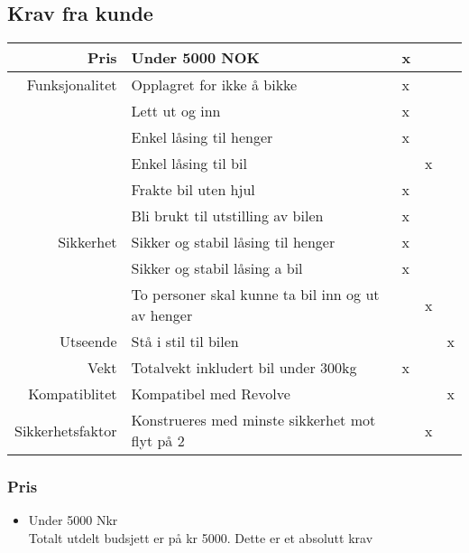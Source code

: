 \subsection{Krav fra kunde}
\begin{tabular}{|r|l|l|l|l|}
	\hline
  		Pris & Under 5000 NOK & x &   &  \\ \hline
		Funksjonalitet  & Opplagret for ikke å bikke  & x &   & \\ \cline{2-5}
				& Lett ut og inn & x &   & \\ \cline{2-5}
				& Enkel låsing til henger & x &   & \\ \cline{2-5}
				& Enkel låsing til bil	&   & x & \\ \cline{2-5}
				& Frakte bil uten hjul & x &   & \\ \cline{2-5}
				& Bli brukt til utstilling av bilen & x &   & \\ \hline
		Sikkerhet	& Sikker og stabil låsing til henger & x &   & \\ \cline{2-5}
				& Sikker og stabil låsing a  bil & x &   & \\ \cline{2-5}
				& To personer skal kunne ta bil inn og ut av henger &   & x & \\ \hline
		Utseende	& Stå i stil til bilen  &    &   & x \\ \hline
		Vekt		& Totalvekt inkludert bil under 300kg & x &   & \\ \hline
		Kompatiblitet 	& Kompatibel med Revolve &   &   & x \\ \hline
		Sikkerhetsfaktor	& Konstrueres med minste sikkerhet mot flyt på 2 &    & x & \\ \hline
\end{tabular}

\subsubsection{Pris}
\begin{itemize}
\item Under 5000 Nkr \\
Totalt utdelt budsjett er på kr 5000. Dette er et absolutt krav
\end{itemize}
